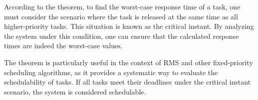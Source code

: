 According to the theorem, to find the worst-case response time of a task, one must consider the scenario where the task is released at the same time as all higher-priority tasks. 
This situation is known as the critical instant. By analyzing the system under this condition, one can ensure that the calculated response times are indeed the worst-case values.

The theorem is particularly useful in the context of \ac{RMS} and other fixed-priority scheduling algorithms, as it provides a systematic way to evaluate the schedulability of tasks. 
If all tasks meet their deadlines under the critical instant scenario, the system is considered schedulable.

